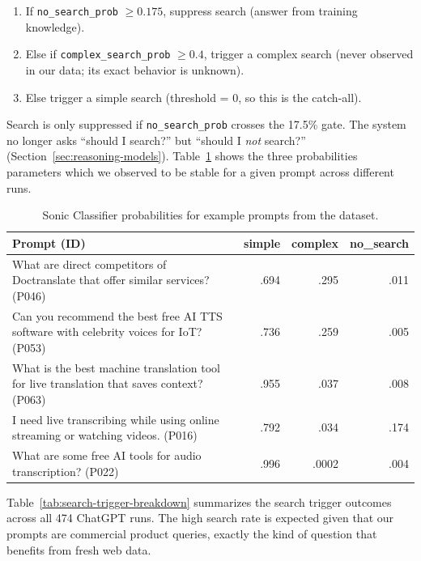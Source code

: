 \begin{enumerate}
    \item If \texttt{no\_search\_prob} $\geq 0.175$, suppress search (answer from training knowledge).
    \item Else if \texttt{complex\_search\_prob} $\geq 0.4$, trigger a complex search (never observed in our data; its exact behavior is unknown).
    \item Else trigger a simple search (threshold = 0, so this is the catch-all).
\end{enumerate}

\noindent Search is only suppressed if \texttt{no\_search\_prob} crosses the 17.5\% gate. The system no longer asks ``should I search?'' but ``should I \emph{not} search?'' (Section~\ref{sec:reasoning-models}).
Table~\ref{tab:classifier-examples} shows the three probabilities parameters which we observed to be stable for a given prompt across different runs.

\begin{table}[H]
\centering
\caption{Sonic Classifier probabilities for example prompts from the dataset.}
\label{tab:classifier-examples}
\small
\begin{tabular}{@{}p{5.2cm}rrr@{}}
\toprule
\textbf{Prompt (ID)} & \textbf{simple} & \textbf{complex} & \textbf{no\_search} \\
\midrule
What are direct competitors of Doctranslate that offer similar services? (P046) & .694 & .295 & .011 \\
Can you recommend the best free AI TTS software with celebrity voices for IoT? (P053) & .736 & .259 & .005 \\
What is the best machine translation tool for live translation that saves context? (P063) & .955 & .037 & .008 \\
I need live transcribing while using online streaming or watching videos. (P016) & .792 & .034 & .174 \\
What are some free AI tools for audio transcription? (P022) & .996 & .0002 & .004 \\
\bottomrule
\end{tabular}
\end{table}

Table~\ref{tab:search-trigger-breakdown} summarizes the search trigger outcomes across all 474 ChatGPT runs. The high search rate is expected given that our prompts are commercial product queries, exactly the kind of question that benefits from fresh web data.


